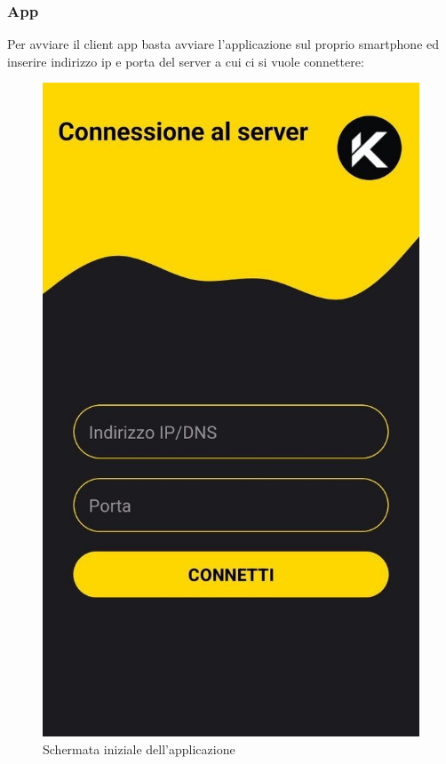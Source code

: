 \subsubsection{App}
\noindent Per avviare il client app basta avviare l'applicazione sul proprio smartphone ed inserire indirizzo ip e porta del server a cui ci si vuole connettere:
\begin{figure}[H]
  \centering
  \includegraphics[scale=0.25]{img/app1.png}
  \caption{Schermata iniziale dell'applicazione}
\end{figure}
